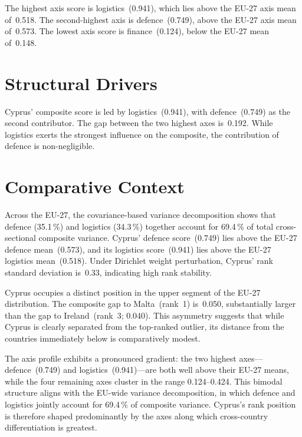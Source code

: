 \documentclass[12pt,a4paper]{article}
\begin{document}
The highest axis score is logistics~(0.941), which lies above the EU-27 axis mean of~0.518.  The second-highest axis is defence~(0.749), above the EU-27 axis mean of~0.573.  The lowest axis score is finance~(0.124), below the EU-27 mean of~0.148.


\section{Structural Drivers}
\label{sec:drivers}

\begin{sloppypar}
Cyprus' composite score is led by logistics~(0.941), with defence~(0.749) as the second contributor.  The gap between the two highest axes is~0.192.  While logistics exerts the strongest influence on the composite, the contribution of defence is non-negligible.
\end{sloppypar}


\section{Comparative Context}
\label{sec:comparative}

Across the EU-27, the covariance-based variance decomposition shows that defence (35.1\,\%) and logistics (34.3\,\%) together account for 69.4\,\% of total cross-sectional composite variance.  Cyprus' defence score~(0.749) lies above the EU-27 defence mean~(0.573), and its logistics score~(0.941) lies above the EU-27 logistics mean~(0.518).  Under Dirichlet weight perturbation, Cyprus' rank standard deviation is~0.33, indicating high rank stability.



Cyprus occupies a distinct position in the upper segment of the EU-27 distribution.  The composite gap to Malta~(rank~1) is~0.050, substantially larger than the gap to Ireland~(rank~3; 0.040).  This asymmetry suggests that while Cyprus is clearly separated from the top-ranked outlier, its distance from the countries immediately below is comparatively modest.

The axis profile exhibits a pronounced gradient: the two highest axes---defence~(0.749) and logistics~(0.941)---are both well above their EU-27 means, while the four remaining axes cluster in the range 0.124--0.424.  This bimodal structure aligns with the EU-wide variance decomposition, in which defence and logistics jointly account for 69.4\,\% of composite variance.  Cyprus's rank position is therefore shaped predominantly by the axes along which cross-country differentiation is greatest.
\end{document}
